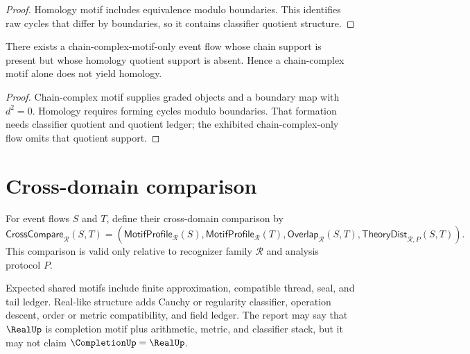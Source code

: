 \begin{proof}
Homology motif includes equivalence modulo boundaries. This identifies raw cycles that differ by boundaries, so it contains classifier quotient structure.
\end{proof}

\begin{theorem}
\label{thm:higher-case-chain-complex-not-homology}
There exists a chain-complex-motif-only event flow whose chain support is present but whose homology quotient support is absent. Hence a chain-complex motif alone does not yield homology.
\end{theorem}

\begin{proof}
Chain-complex motif supplies graded objects and a boundary map with $d^2=0$. Homology requires forming cycles modulo boundaries. That formation needs classifier quotient and quotient ledger; the exhibited chain-complex-only flow omits that quotient support.
\end{proof}

\section{Cross-domain comparison}
\label{sec:higher-case-cross-domain}

\begin{definition}
\label{def:higher-case-cross-domain-comparison}
For event flows $S$ and $T$, define their cross-domain comparison by
$$
  \mathsf{CrossCompare}_{\mathcal R}(S,T)
  =
  (
  \mathsf{MotifProfile}_{\mathcal R}(S),
  \mathsf{MotifProfile}_{\mathcal R}(T),
  \mathsf{Overlap}_{\mathcal R}(S,T),
  \mathsf{TheoryDist}_{\mathcal R,P}(S,T)
  ).
$$
This comparison is valid only relative to recognizer family $\mathcal R$ and analysis protocol $P$.
\end{definition}

\begin{example}
\label{ex:higher-case-completion-real}
Expected shared motifs include finite approximation, compatible thread, seal, and tail ledger. Real-like structure adds Cauchy or regularity classifier, operation descent, order or metric compatibility, and field ledger. The report may say that $\RealUp$ is completion motif plus arithmetic, metric, and classifier stack, but it may not claim $\CompletionUp=\RealUp$.
\end{example}

